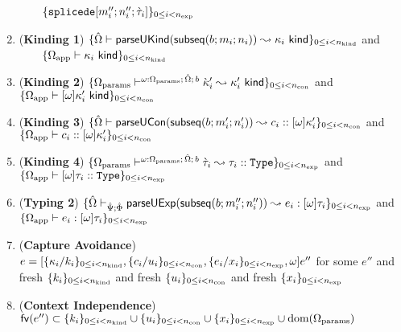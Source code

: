\documentclass[acmsmall,review,anonymous]{acmart}\settopmatter{printfolios=true,printccs=false,printacmref=false}
\begin{document}
\begin{theorem}
\begin{enumerate}
     ~~~~$          \{\texttt{splicede}[m''_i; n''_i; \grave{\tau}_i]\}_{0 \leq i < n_\text{exp}}
    $
  \item (\textbf{Kinding 1}) $\{{\hat\Omega} \vdash \mathsf{parseUKind}(\mathsf{subseq}(b; m_i; n_i)) \leadsto \kappa_i~\mathsf{kind}\}_{0 \leq i < n_\text{kind}}$ and \\ ~~~~$\{\Omega_\text{app} \vdash \kappa_i~\mathsf{kind}\}_{0 \leq i < n_\text{kind}}$
  \item (\textbf{Kinding 2}) $\{\Omega_\text{params} \vdash^{\omega : \Omega_\text{params};\,{\hat\Omega};\,b} {\grave\kappa}'_i \leadsto \kappa'_i~\mathsf{kind}\}_{0 \leq i < n_\text{con}}$ and $\{\Omega_\text{app} \vdash [\omega]\kappa'_i~\mathsf{kind}\}_{0 \leq i < n_\text{con}}$
  \item (\textbf{Kinding 3}) $\{{\hat\Omega} \vdash \mathsf{parseUCon}(\mathsf{subseq}(b; m'_i; n'_i)) \leadsto c_i :: [\omega]\kappa'_i\}_{0 \leq i < n_\text{con}}$ and $\{\Omega_\text{app} \vdash c_i :: [\omega]\kappa'_i\}_{0 \leq i < n_\text{con}}$
  \item (\textbf{Kinding 4}) $\{\Omega_\text{params} \vdash^{\omega : \Omega_\text{params};\,{\hat\Omega};\,b} \grave{\tau}_i \leadsto \tau_i :: \texttt{Type}\}_{0 \leq i < n_\text{exp}}$ and $\{\Omega_\text{app} \vdash [\omega]\tau_i :: \texttt{Type}\}_{0 \leq i < n_\text{exp}}$
  \item (\textbf{Typing 2}) $\{{\hat\Omega} \vdash_{\hat{\Psi}; \hat\Phi} \mathsf{parseUExp}(\mathsf{subseq}(b; m''_i; n''_i)) \leadsto e_i : [\omega]\tau_i\}_{0 \leq i < n_\text{exp}}$ and $\{\Omega_\text{app} \vdash e_i : [\omega]\tau_i\}_{0 \leq i < n_\text{exp}}$
  \item (\textbf{Capture Avoidance}) $e = [\{\kappa_i/k_i\}_{0 \leq i < n_\text{kind}}, \{c_i/u_i\}_{0 \leq i < n_\text{con}}, \{e_i/x_i\}_{0 \leq i < n_\text{exp}}, \omega]e''$ for some $e''$ and fresh $\{k_i\}_{0 \leq i < n_\text{kind}}$ and fresh $\{u_i\}_{0 \leq i < n_\text{con}}$ and fresh $\{x_i\}_{0 \leq i < n_\text{exp}}$
  \item (\textbf{Context Independence}) $\mathsf{fv}(e'') \subset \{k_i\}_{0 \leq i < n_\text{kind}} \cup \{u_i\}_{0 \leq i < n_\text{con}} \cup \{x_i\}_{0 \leq i < n_\text{exp}} \cup \text{dom}(\Omega_\text{params})$
\end{enumerate}
\end{theorem}

\vspace{-6px}
\end{document}
